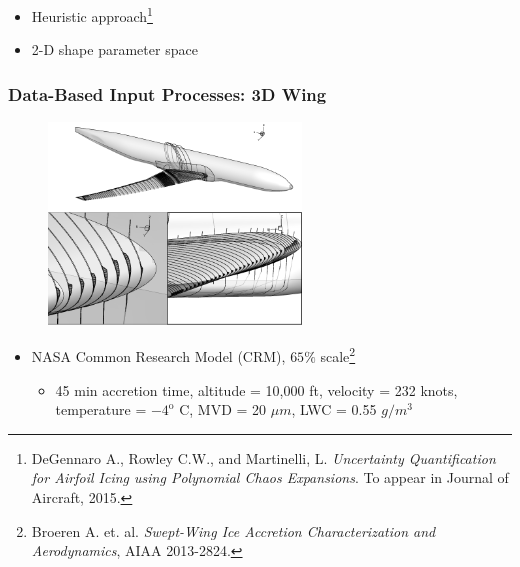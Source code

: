 \documentclass[9pt]{beamer}
\begin{document}
\begin{frame}
\begin{itemize}
\item Heuristic approach\footnote{DeGennaro A., Rowley C.W., and Martinelli,
L. \emph{Uncertainty Quantification for Airfoil Icing using Polynomial Chaos Expansions}. To appear in Journal of Aircraft, 2015.
 }
\item 2-D shape parameter space
\end{itemize}
\end{frame}
\begin{frame}
\frametitle{Data-Based Input Processes: 3D Wing}
\label{sec-2-2}

\begin{figure}
  \centering
  \includegraphics[width=0.6\textwidth]{CRMHorn}
\end{figure}

\begin{itemize}
\item NASA Common Research Model (CRM), $65\%$ scale\footnote{Broeren A. et. al. \emph{Swept-Wing Ice Accretion Characterization and Aerodynamics}, AIAA 2013-2824.
 }
\begin{itemize}
\item 45 min accretion time, altitude = 10,000 ft, velocity = 232 knots,
    temperature = $-4^{\text{o}}$ C, MVD = 20 $\mu m$, LWC = 0.55
    $g/m^3$
\end{itemize}
\end{itemize}
\end{frame}
\end{document}
